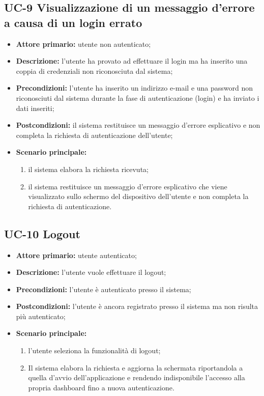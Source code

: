 \subsection{UC-9 Visualizzazione di un messaggio d'errore a causa di un login errato}
\begin{itemize}
	\item \textbf{Attore primario:} utente non autenticato;

	\item \textbf{Descrizione:} l'utente ha provato ad effettuare il login ma ha inserito una coppia di credenziali non riconosciuta dal sistema;

	\item \textbf{Precondizioni:} l'utente ha inserito un indirizzo e-mail e una password non riconosciuti dal sistema durante la fase di autenticazione (login) e ha inviato i dati inseriti;

	\item \textbf{Postcondizioni:} il sistema restituisce un messaggio d'errore esplicativo e non completa la richiesta di autenticazione dell'utente;

	\item \textbf{Scenario principale:} 

	\begin{enumerate}
   		 \item il sistema elabora la richiesta ricevuta;
    	 \item il sistema restituisce un messaggio d'errore esplicativo che viene visualizzato sullo schermo del dispositivo dell'utente e non completa la richiesta di autenticazione.
	\end{enumerate}
\end{itemize}
\subsection{UC-10 Logout}
\begin{itemize}
	\item \textbf{Attore primario:} utente autenticato;

	\item \textbf{Descrizione:} l'utente vuole effettuare il logout; 

	\item \textbf{Precondizioni:} l'utente è autenticato presso il sistema;

	\item \textbf{Postcondizioni:} l'utente è ancora registrato presso il sistema ma non risulta più autenticato;

	\item \textbf{Scenario principale:}

	\begin{enumerate}
   		 \item l'utente seleziona la funzionalità di logout;
    	 \item Il sistema elabora la richiesta e aggiorna la schermata riportandola a quella d'avvio dell'applicazione e rendendo indisponibile l'accesso alla propria dashboard fino a nuova autenticazione.
	\end{enumerate}
\end{itemize}
